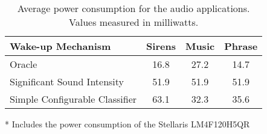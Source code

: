 \bgroup
\def\arraystretch{1.5}
\begin{table}[t]
\begin{threeparttable}
\centering
{\small
	\begin{tabular}{|l|c|c|c|}
	\hline
	\textbf{Wake-up Mechanism}     & \textbf{Sirens}   & \textbf{Music}   & \textbf{Phrase} \\ \hline
	Oracle                         & 16.8              & 27.2             & 14.7            \\ \hline
	Significant Sound Intensity    & 51.9              & 51.9             & 51.9            \\ \hline
	Simple Configurable Classifier & 63.1\tnote{*}    & 32.3             & 35.6            \\ \hline         
	\end{tabular}
	\begin{tablenotes}
		\item{*} Includes the power consumption of the Stellaris LM4F120H5QR
	\end{tablenotes}
}
\caption{Average power consumption for the audio applications.  Values measured in milliwatts.}
\label{table:macrobenchmarksAudio}
\end{threeparttable}
\end{table}
\egroup

